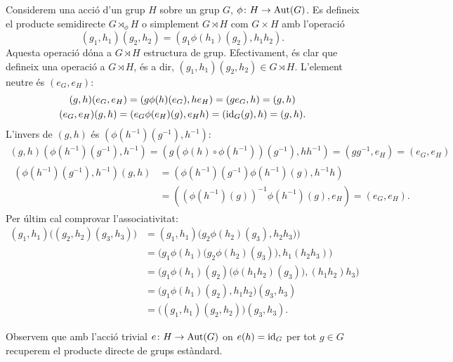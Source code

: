 \documentclass[12pt]{article}
\begin{document}
Considerem una acció d'un grup \( H \) sobre un grup \( G \), \( \phi \colon H \to
\operatorname{Aut}(G) \). Es defineix el producte semidirecte \( G \rtimes_\phi H \) o simplement \( G
\rtimes H \) com \( G \times H \) amb l'operació
\begin{equation*}
	(g_1, h_1)(g_2, h_2) = (g_1 \phi(h_1)(g_2), h_1 h_2).
\end{equation*}
Aquesta operació dóna a \( G \rtimes H \) estructura de grup. Efectivament, és clar que
defineix una operació a \( G\rtimes H \), és a dir, \( (g_1, h_1)(g_2, h_2) \in G\rtimes H
\). L'element neutre és \( (e_G, e_H) \):
\begin{gather*}
	(g,h)(e_G, e_H) = (g \phi(h)(e_G), he_H) = (g e_G, h) = (g,h) \\
	(e_G, e_H)(g,h) = (e_G \phi(e_H)(g), e_H h) = (\mathrm{id}_G(g), h) = (g,h).
\end{gather*}
L'invers de \( (g,h) \) és \( (\phi(h^{-1})(g^{-1}), h^{-1}) \):
\begin{gather*}
	(g,h)(\phi(h^{-1})(g^{-1}), h^{-1}) = \left(g \left(\phi(h) \circ \phi(h^{-1})\right)(g^{-1}),
	hh^{-1}\right) = (gg^{-1}, e_H) = (e_G, e_H) \\
	\begin{aligned}
		(\phi(h^{-1})(g^{-1}), h^{-1})(g,h) & = (\phi(h^{-1})(g^{-1}) \phi(h^{-1})(g),
		h^{-1}h) \\
																				& =	\left(\left(\phi(h^{-1})(g)\right)^{-1}
																				\phi(h^{-1})(g), e_H\right) = (e_G, e_H).
	\end{aligned}
\end{gather*}
Per últim cal comprovar l'associativitat:
\begin{align*}
	(g_1,h_1)\big((g_2, h_2)(g_3, h_3)\big) & = (g_1,h_1) \big(g_2 \phi(h_2)(g_3), h_2
	h_3)\big) \\
																					& = \Big(g_1 \phi(h_1)\big(g_2
																					\phi(h_2)(g_3)\big), h_1(h_2h_3)\Big) \\
																					& = \Big(g_1 \phi(h_1)(g_2)
																					\big(\phi(h_1h_2)(g_3)\big), (h_1h_2)h_3\Big)
																				\\
																					& = \big(g_1\phi(h_1)(g_2), h_1h_2\big)(g_3,h_3) \\
																					& =
																					\big((g_1,h_1)(g_2,h_2)\big)(g_3,h_3).
\end{align*}

Observem que amb l'acció trivial \( e \colon H \to \operatorname{Aut}(G) \) on \( e(h) = \mathrm{id}_G \) per
tot \( g \in G \) recuperem el producte directe de grups estàndard.
\end{document}
